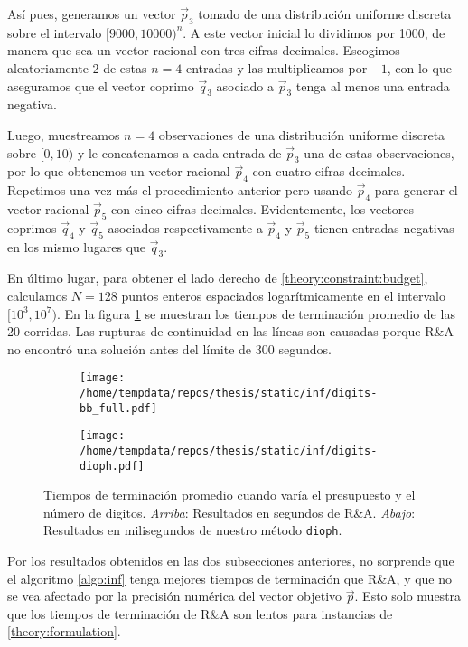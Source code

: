 Así pues, generamos un vector $\vec{p}_3$ tomado de una distribución uniforme discreta sobre el
intervalo $[9000, 10000)^n$. A este vector inicial lo dividimos por 1000, de manera que sea un
vector racional con tres cifras decimales. Escogimos aleatoriamente 2 de estas $n = 4$ entradas y
las multiplicamos por $-1$, con lo que aseguramos que el vector coprimo $\vec{q}_3$ asociado a
$\vec{p}_3$ tenga al menos una entrada negativa.

Luego, muestreamos $n = 4$ observaciones de una distribución uniforme discreta sobre $[0, 10)$ y le
concatenamos a cada entrada de $\vec{p}_3$ una de estas observaciones, por lo que obtenemos un
vector racional $\vec{p}_4$ con cuatro cifras decimales. Repetimos una vez más el procedimiento
anterior pero usando $\vec{p}_4$ para generar el vector racional $\vec{p}_5$ con cinco cifras
decimales. Evidentemente, los vectores coprimos $\vec{q}_4$ y $\vec{q}_5$ asociados respectivamente
a $\vec{p}_4$ y $\vec{p}_5$ tienen entradas negativas en los mismo lugares que $\vec{q}_3$.

En último lugar, para obtener el lado derecho de \eqref{theory:constraint:budget}, calculamos $N = 128$
puntos enteros espaciados logarítmicamente en el intervalo $[10^3, 10^7)$. En la figura
\ref{fig:exp:inf:rhs} se muestran los tiempos de terminación promedio de las 20 corridas. Las
rupturas de continuidad en las líneas son causadas porque R\&A no encontró una solución antes del
límite de 300 segundos.

\begin{figure}[hbtp]
  \centering
  \begin{subfigure}{0.80\textwidth}
    \centering
    \texttt{[image: /home/tempdata/repos/thesis/static/inf/digits-bb\_full.pdf]}
  \end{subfigure}
  \hfill
  \begin{subfigure}{0.80\textwidth}
    \centering
    \texttt{[image: /home/tempdata/repos/thesis/static/inf/digits-dioph.pdf]}
  \end{subfigure}

  \caption{Tiempos de terminación promedio cuando varía el presupuesto y el
			número de digitos. \textit{Arriba}: Resultados en segundos de R\&A. \textit{Abajo}:
			Resultados en milisegundos de nuestro método \texttt{dioph}.}
  \label{fig:exp:inf:rhs}
\end{figure}

Por los resultados obtenidos en las dos subsecciones anteriores, no sorprende que el algoritmo
\ref{algo:inf} tenga mejores tiempos de terminación que R\&A, y que no se vea afectado por la
precisión numérica del vector objetivo $\vec{p}$. Esto solo muestra que los tiempos de terminación
de R\&A son lentos para instancias de \eqref{theory:formulation}.

